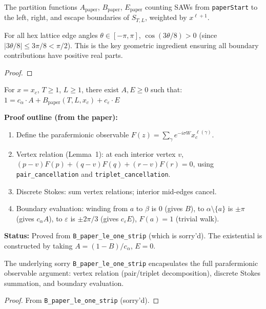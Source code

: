 \begin{definition}\label{def:paper_partition}
\leanok
{}
  The partition functions $A_{\text{paper}}$, $B_{\text{paper}}$, $E_{\text{paper}}$
  counting SAWs from \texttt{paperStart} to the left, right, and escape
  boundaries of $S_{T,L}$, weighted by $x^{\ell+1}$.
\end{definition}

\begin{lemma}\label{lem:boundary_cos}
\leanok
  For all hex lattice edge angles $\theta \in [-\pi, \pi]$,
  $\cos(3\theta/8) > 0$ (since $|3\theta/8| \leq 3\pi/8 < \pi/2$).
  This is the key geometric ingredient ensuring all boundary
  contributions have positive real parts.
\end{lemma}
\begin{proof}
\leanok
\end{proof}

\begin{theorem}\label{thm:strip_identity_genuine}
  For $x = x_c$, $T \geq 1$, $L \geq 1$, there exist $A, E \geq 0$ such that:
  $1 = c_{\alpha} \cdot A + B_{\text{paper}}(T, L, x_c) + c_{\varepsilon} \cdot E$

  \textbf{Proof outline (from the paper):}
  \begin{enumerate}
    \item Define the parafermionic observable $F(z) = \sum_{\gamma} e^{-i\sigma W} x_c^{\ell(\gamma)}$.
    \item Vertex relation (Lemma~1): at each interior vertex $v$, $(p-v)F(p)+(q-v)F(q)+(r-v)F(r)=0$,
          using \texttt{pair\_cancellation} and \texttt{triplet\_cancellation}.
    \item Discrete Stokes: sum vertex relations; interior mid-edges cancel.
    \item Boundary evaluation: winding from $a$ to $\beta$ is 0 (gives $B$),
          to $\alpha\setminus\{a\}$ is $\pm\pi$ (gives $c_{\alpha} A$),
          to $\varepsilon$ is $\pm 2\pi/3$ (gives $c_{\varepsilon} E$),
          $F(a)=1$ (trivial walk).
  \end{enumerate}

  \textbf{Status:} Proved from \texttt{B\_paper\_le\_one\_strip}
  (which is sorry'd). The existential is constructed by taking
  $A = (1 - B)/c_{\alpha}$, $E = 0$.

  The underlying sorry \texttt{B\_paper\_le\_one\_strip} encapsulates
  the full parafermionic observable argument: vertex relation
  (pair/triplet decomposition), discrete Stokes summation, and
  boundary evaluation.
\end{theorem}
\begin{proof}
  From \texttt{B\_paper\_le\_one\_strip} (sorry'd).
\end{proof}

